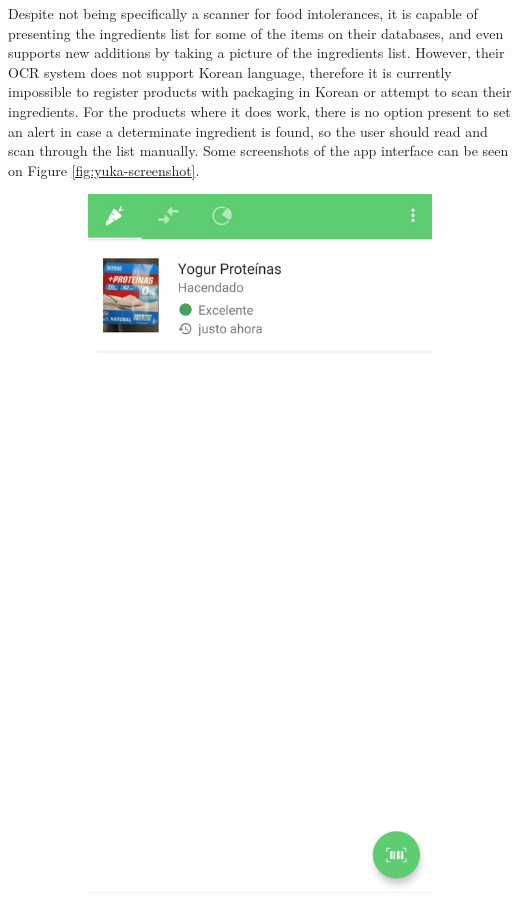 Despite not being specifically a scanner for food intolerances, it is capable of presenting the ingredients list for some of the items on their databases, and even supports new additions by taking a picture of the ingredients list. However, their OCR system does not support Korean language, therefore it is currently impossible to register products with packaging in Korean or attempt to scan their ingredients. For the products where it does work, there is no option present to set an alert in case a determinate ingredient is found, so the user should read and scan through the list manually. Some screenshots of the app interface can be seen on Figure \ref{fig:yuka-screenshot}.

\begin{figure}[h]
    \centering
    \begin{subfigure}{0.3\textwidth}
        \centering
        \includegraphics[width=0.9\linewidth]{Figures/Yuka-1.jpg}

\end{subfigure}
\end{figure}

